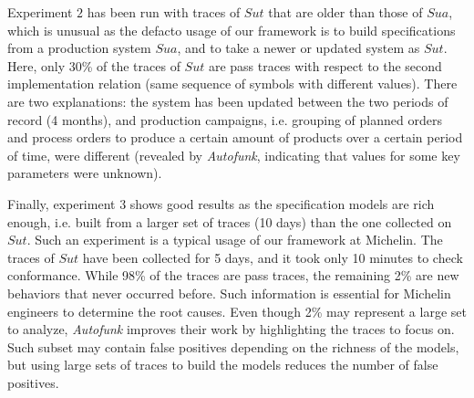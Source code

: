 Experiment $2$ has been run with traces of $\mathit{Sut}$ that
are older than those of $\mathit{Sua}$, which is unusual as the
defacto usage of our framework is to build specifications from a
production system $\mathit{Sua}$, and to take a newer or updated
system as $\mathit{Sut}$.  Here, only 30\% of the traces of
$\mathit{Sut}$ are pass traces with respect to the second implementation
relation (same sequence of symbols with different values). There
are two explanations: the system has been updated between the two
periods of record (4 months), and production campaigns, i.e.
grouping of planned orders and process orders to produce a
certain amount of products over a certain period of time, were
different (revealed by \textit{Autofunk}, indicating that values
for some key parameters were unknown).

Finally, experiment $3$ shows good results as the specification
models are rich enough, i.e.  built from a larger set of traces
(10 days) than the one collected on $\mathit{Sut}$. Such an
experiment is a typical usage of our framework at Michelin.  The
traces of $\mathit{Sut}$ have been collected for 5 days, and it
took only 10 minutes to check conformance. While 98\% of the
traces are pass traces, the remaining 2\% are new behaviors that
never occurred before. Such information is essential for Michelin
engineers to determine the root causes. Even though 2\% may
represent a large set to analyze, \textit{Autofunk} improves
their work by highlighting the traces to focus on.  Such subset
may contain false positives depending on the richness of the
models, but using large sets of traces to build the models
reduces the number of false positives.
